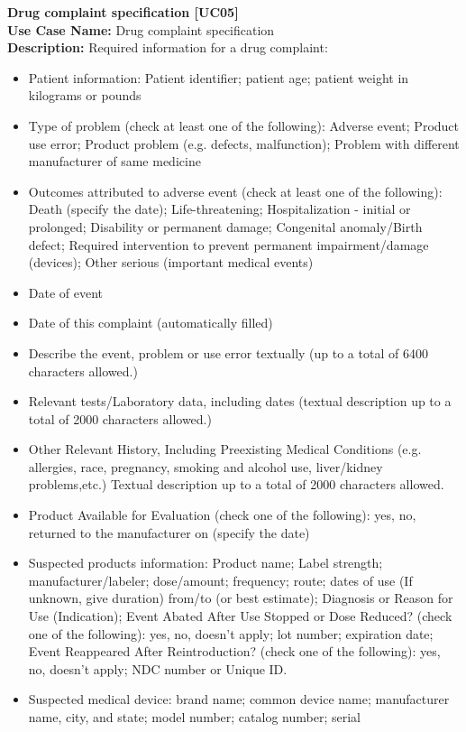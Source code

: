 \documentclass[11pt,twoside]{article}
\begin{document}
\textbf{Drug complaint specification [UC05]}\\
\textbf{Use Case Name:} Drug complaint specification\\
\textbf{Description:}
Required information for a drug complaint: 
\begin{itemize}
\item Patient information: Patient identifier; patient age; patient weight in kilograms or pounds
\item Type of problem (check at least one of the following): Adverse event; Product use error; Product problem (e.g. defects, malfunction);
Problem with different manufacturer of same medicine
\item Outcomes attributed to adverse event (check at least one of the following): Death (specify the date); Life-threatening;
Hospitalization - initial or prolonged; Disability or permanent damage; Congenital anomaly/Birth defect; Required intervention to prevent
permanent impairment/damage (devices); Other serious (important medical events)
\item Date of event 
\item Date of this complaint (automatically filled)
\item Describe the event, problem or use error textually (up to a total of 6400 characters allowed.)
\item Relevant tests/Laboratory data, including dates (textual description up to a total of 2000 characters allowed.)
\item Other Relevant History, Including Preexisting Medical Conditions (e.g. allergies, race, pregnancy, smoking and alcohol use,
liver/kidney problems,etc.) Textual description up to a total of 2000 characters allowed.
\item Product Available for Evaluation (check one of the following): yes, no, returned to the manufacturer on (specify the date)
\item Suspected products information: Product name; Label strength; manufacturer/labeler; dose/amount; frequency; route; dates of use (If
unknown, give duration) from/to (or best estimate); Diagnosis or Reason for Use (Indication); Event Abated After Use Stopped or Dose
Reduced? (check one of the following): yes, no, doesn't apply; lot number; expiration date; Event Reappeared After Reintroduction? (check
one of the following): yes, no, doesn't apply; NDC number or Unique ID.
\item Suspected medical device: brand name; common device name; manufacturer name, city, and state; model number; catalog number; serial

\end{itemize}
\end{document}
